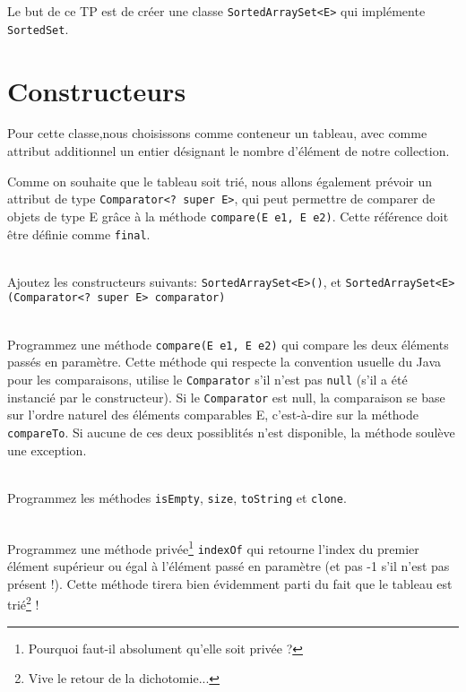 \documentclass[iutinfo,a4paper,nocorrections,10pt]{ustl-tdtp}
\date{\annee{2017}--\annee{2018}}
\begin{document}

\maketitle
\thispagestyle{empty}

Le but de ce TP est de créer une classe \texttt{SortedArraySet<E>} qui implémente \texttt{SortedSet}. 

\section{Constructeurs}

Pour cette classe,nous choisissons comme conteneur un tableau, avec comme attribut additionnel un entier désignant le nombre d'élément de notre collection.

Comme on souhaite que le tableau soit trié, nous allons également prévoir un attribut de type \texttt{Comparator<? super E>}, qui peut permettre de comparer de objets de type E grâce à la méthode \texttt{compare(E e1, E e2)}. Cette référence doit être définie comme \texttt{final}.

~\\ \question Ajoutez les constructeurs suivants: \texttt{SortedArraySet<E>()}, et  
\texttt{SortedArraySet<E>(Comparator<? super E> comparator)} 

~\\ \question Programmez une méthode \texttt{compare(E e1, E e2)} qui compare les deux éléments passés en paramètre. Cette méthode qui respecte la convention usuelle du Java pour les comparaisons, utilise le \texttt{Comparator} s'il n'est pas \texttt{null} (s'il a été instancié par le constructeur). Si le \texttt{Comparator} est null, la comparaison se base sur l'ordre naturel des éléments comparables E, c'est-à-dire sur la méthode \texttt{compareTo}. Si aucune de ces deux possiblités n'est disponible, la méthode soulève une exception.

~\\ \question Programmez les méthodes \texttt{isEmpty},  \texttt{size}, \texttt{toString} et \texttt{clone}.

~\\ \question Programmez une méthode privée\footnote{Pourquoi faut-il absolument qu'elle soit privée ?} \texttt{indexOf} qui retourne l'index du premier élément supérieur ou égal à l'élément passé en paramètre (et pas -1 s'il n'est pas présent !). Cette méthode tirera bien évidemment parti du fait que le tableau est trié\footnote{Vive le retour de la dichotomie...} ! 
\end{document}
